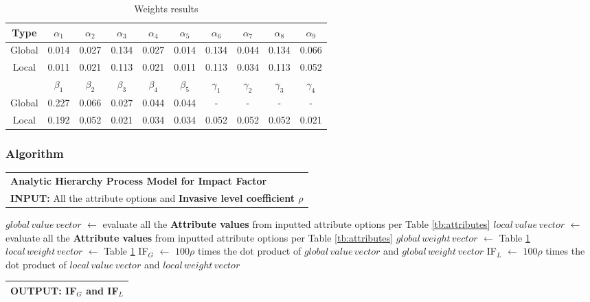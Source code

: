 \documentclass[12pt]{article}
\newcommand{\toB}[1]{\color{blue}#1\color{black}}
\begin{document}
		{
			\fontsize{10}{14}\selectfont
			{
				\begin{longtable}{c|ccccccccc}
					\caption{Weights results}
					\label{tb:weights}\\
					
					\toprule
					Type&$\alpha_1$&$\alpha_2$&$\alpha_3$&$\alpha_4$&$\alpha_5$&$\alpha_6$&$\alpha_7$&$\alpha_8$&$\alpha_9$\\
					\toprule
					Global&0.014&0.027&0.134&0.027&0.014&0.134&0.044&0.134&0.066\\
					Local&0.011&0.021&0.113&0.021&0.011&0.113&0.034&0.113&0.052\\
					\toprule
					\toprule
					&$\beta_1$&$\beta_2$&$\beta_3$&$\beta_4$&$\beta_5$&$\gamma_1$&$\gamma_2$&$\gamma_3$&$\gamma_4$\\
					\toprule
					Global&0.227&0.066&0.027&0.044&0.044&-&-&-&-\\
					Local&0.192&0.052&0.021&0.034&0.034&0.052&0.052&0.052&0.021\\
					\bottomrule
				\end{longtable}
			}
		}	
	
		\subsubsection{Algorithm}	
		\vspace{-0.4cm}
		{
			\fontsize{10}{14}\selectfont
			{
				\setlength{\parindent}{-1em}
				
				{
					\fontsize{12}{18}\selectfont
					\begin{longtable}{p{6.65in}}
						\toprule
						\textbf{Analytic Hierarchy Process Model for Impact Factor}\\
						\textbf{INPUT:} All the attribute options and \textbf{Invasive level coefficient $\rho$} \\
						\bottomrule
					\end{longtable}
				}
				
				\vspace{-0.5em}
				\begin{algorithmic}
					\State \toB{$global\,value\,vector$ } $\gets$ evaluate all the \textbf{Attribute values} from inputted attribute options per Table \ref{tb:attributes}
					\State \toB{$local\,value\,vector$ } $\gets$ evaluate all the \textbf{Attribute values} from inputted attribute options  per Table \ref{tb:attributes}
					\State \toB{$global\,weight\,vector$ } $\gets$ Table \ref{tb:weights}
					\State \toB{$local\,weight\,vector$ } $\gets$ Table \ref{tb:weights}
					\State \toB{IF$_G$ } $\gets$ \toB{$100\rho$ } times the dot product of \toB{$global\,value\,vector$ } and \toB{$global\,weight\,vector$ }
					\State \toB{IF$_L$ } $\gets$ \toB{$100\rho$ } times the dot product of \toB{$local\,value\,vector$ } and \toB{$local\,weight\,vector$ }
				\end{algorithmic}
				
				{
					\fontsize{12}{18}\selectfont
					\begin{longtable}{p{6.6in}}
						\toprule
						\textbf{OUTPUT:} \toB{IF$_G$ } and \toB{IF$_L$}\\
						\bottomrule
					\end{longtable}
				}
			}
		}	
		
\end{document}
